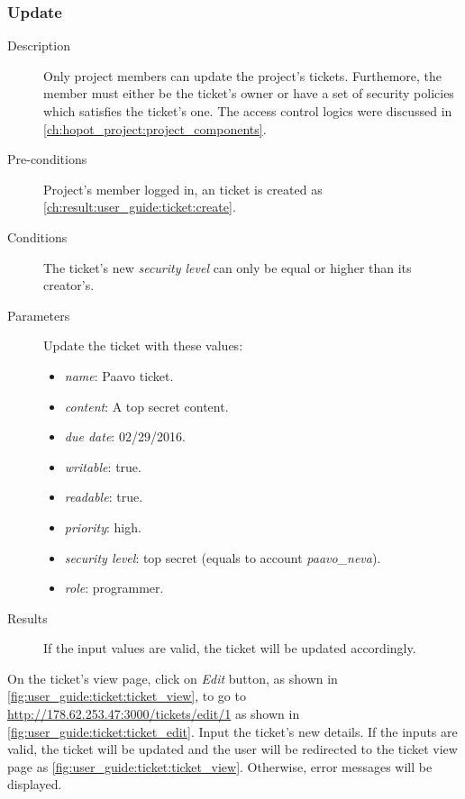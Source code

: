 \clearpage

\subsubsection{Update}
\label{ch:result:user_guide:ticket:update}

\begin{description}
\item[Description] Only project members can update the project's tickets.
Furthemore, the member must either be the ticket's owner or have a set of security policies which satisfies the ticket's one.
The access control logics were discussed in \autoref{ch:hopot_project:project_components}.
\item[Pre-conditions] Project's member logged in, an ticket is created as \autoref{ch:result:user_guide:ticket:create}.
\item[Conditions] The ticket's new \emph{security level} can only be equal or higher than its creator's.
\item[Parameters] Update the ticket with these values:
\begin{itemize}
\item \emph{name}: Paavo ticket.
\item \emph{content}: A top secret content.
\item \emph{due date}: 02/29/2016.
\item \emph{writable}: true.
\item \emph{readable}: true.
\item \emph{priority}: high.
\item \emph{security level}: top secret (equals to account \emph{paavo\_neva}).
\item \emph{role}: programmer.
\end{itemize}
\item[Results] If the input values are valid, the ticket will be updated accordingly.
\end{description}

On the ticket's view page, click on \emph{Edit} button, as shown in \autoref{fig:user_guide:ticket:ticket_view}, to go to \href{http://178.62.253.47:3000/tickets/edit/1}{http://178.62.253.47:3000/tickets/edit/1} as shown in \autoref{fig:user_guide:ticket:ticket_edit}.
Input the ticket's new details.
If the inputs are valid, the ticket will be updated and the user will be redirected to the ticket view page as \autoref{fig:user_guide:ticket:ticket_view}.
Otherwise, error messages will be displayed.

